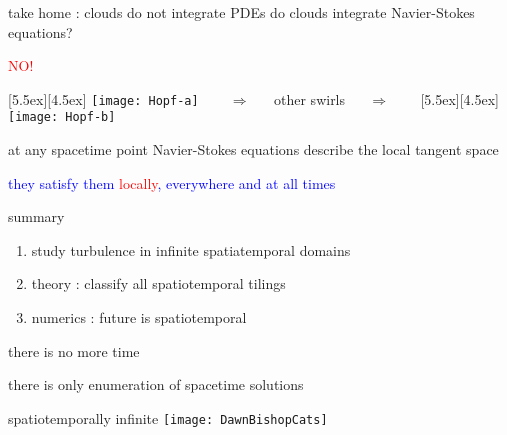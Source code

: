 \begin{frame}{take home : clouds do not integrate PDEs}
do clouds integrate Navier-Stokes equations?

\begin{center}
\centerline{\textcolor{red}{\Huge NO!}}

\begin{minipage}[t]{\textwidth}
	\begin{center}
\centerline{
\raisebox{-4.0ex}[5.5ex][4.5ex]
		 {\texttt{[image: Hopf-a]}}
~~~ $\Longrightarrow$ ~~ {other swirls} ~~ $\Longrightarrow$ ~~~
	\raisebox{-4.0ex}[5.5ex][4.5ex]
		 {\texttt{[image: Hopf-b]}}
          }
	\end{center}
\end{minipage}
\end{center}

at any spacetime point Navier-Stokes equations describe the local tangent space

\bigskip

\centerline{
\textcolor{blue}{they satisfy them \textcolor{red}{\large locally}, everywhere and at all times}
}
\end{frame}


\begin{frame}{summary}
\begin{enumerate}
              \item
study turbulence in infinite spatiatemporal domains
              \item
theory : classify all spatiotemporal tilings
              \item
numerics : future is spatiotemporal
\end{enumerate}

\vfill

there is no more time

\medskip

there is only enumeration of spacetime solutions
\end{frame}

\begin{frame}{spatiotemporally infinite \catlatt}
\hfill\texttt{[image: DawnBishopCats]}
\end{frame}

